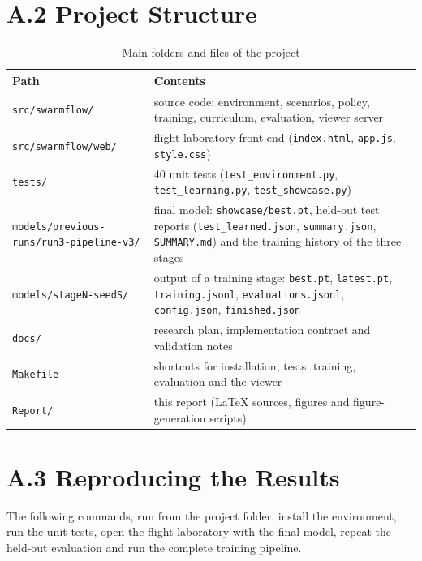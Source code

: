 \section*{A.2 Project Structure}
\begin{table}[htbp]
\centering
\caption{Main folders and files of the project}
\label{tab:structure}
\small
\begin{tabularx}{\textwidth}{@{}lX@{}}
\toprule
Path & Contents\\
\midrule
\texttt{src/swarmflow/} & source code: environment, scenarios, policy, training, curriculum, evaluation, viewer server\\
\texttt{src/swarmflow/web/} & flight-laboratory front end (\texttt{index.html}, \texttt{app.js}, \texttt{style.css})\\
\texttt{tests/} & 40 unit tests (\texttt{test\_environment.py}, \texttt{test\_learning.py}, \texttt{test\_showcase.py})\\
\texttt{models/previous-runs/run3-pipeline-v3/} & final model: \texttt{showcase/best.pt}, held-out test reports
(\texttt{test\_learned.json}, \texttt{summary.json}, \texttt{SUMMARY.md}) and the training history of the three stages\\
\texttt{models/stageN-seedS/} & output of a training stage: \texttt{best.pt}, \texttt{latest.pt},
\texttt{training.jsonl}, \texttt{evaluations.jsonl}, \texttt{config.json}, \texttt{finished.json}\\
\texttt{docs/} & research plan, implementation contract and validation notes\\
\texttt{Makefile} & shortcuts for installation, tests, training, evaluation and the viewer\\
\texttt{Report/} & this report (LaTeX sources, figures and figure-generation scripts)\\
\bottomrule
\end{tabularx}
\end{table}

\section*{A.3 Reproducing the Results}
The following commands, run from the project folder, install the environment, run the unit tests, open the
flight laboratory with the final model, repeat the held-out evaluation and run the complete training pipeline.

